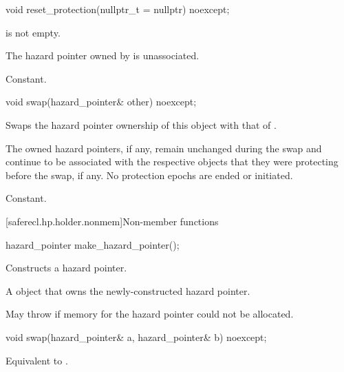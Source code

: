 %
\begin{itemdecl}
void reset_protection(nullptr_t = nullptr) noexcept;
\end{itemdecl}

\begin{itemdescr}
\pnum
\expects
{} is not empty.

\pnum
\ensures
The hazard pointer owned by  is unassociated.

\pnum
\complexity
Constant.
\end{itemdescr}

%
\begin{itemdecl}
void swap(hazard_pointer& other) noexcept;
\end{itemdecl}

\begin{itemdescr}
\pnum
\effects
Swaps the hazard pointer ownership of this object with that of .
\begin{note}
The owned hazard pointers, if any, remain unchanged during the swap and
continue to be associated with the respective objects
that they were protecting before the swap, if any.
No protection epochs are ended or initiated.
\end{note}

\pnum
\complexity
Constant.
\end{itemdescr}

[saferecl.hp.holder.nonmem]{Non-member functions}

%
\begin{itemdecl}
hazard_pointer make_hazard_pointer();
\end{itemdecl}

\begin{itemdescr}
\pnum
\effects
Constructs a hazard pointer.

\pnum
\returns
A  object that owns the newly-constructed hazard pointer.

\pnum
\throws
May throw 
if memory for the hazard pointer could not be allocated.
\end{itemdescr}

%
\begin{itemdecl}
void swap(hazard_pointer& a, hazard_pointer& b) noexcept;
\end{itemdecl}

\begin{itemdescr}
\pnum
\effects
Equivalent to .
\end{itemdescr}
